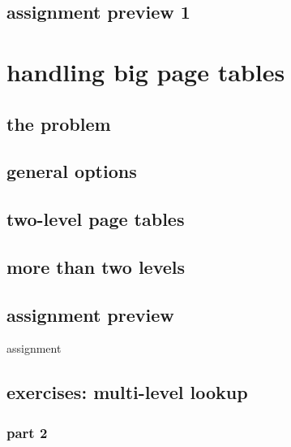 \subsection{assignment preview 1}





\section{handling big page tables}
\subsection{the problem}


\subsection{general options}


\subsection{two-level page tables}




\subsection{more than two levels}


\subsection{assignment preview}
\begin{frame}{assignment}
\end{frame}

\subsection{exercises: multi-level lookup}
\subsubsection{part 2}

